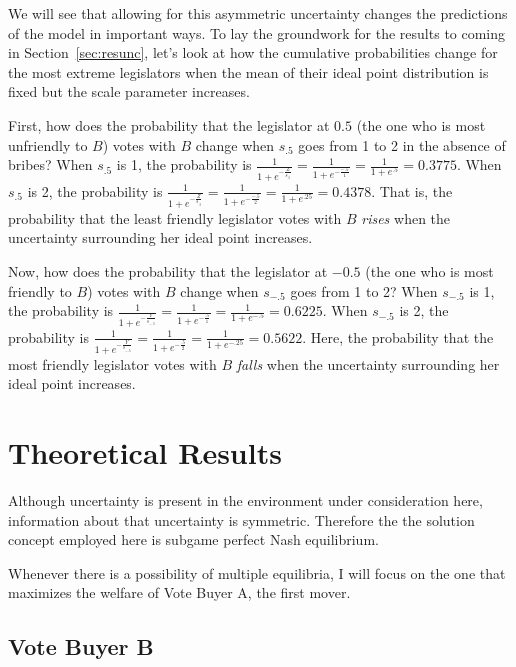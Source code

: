 \documentclass[12pt]{article}
\begin{document}
We will see that allowing for this asymmetric uncertainty changes the predictions of the model in important ways. To lay the groundwork for the results to coming in Section~\ref{sec:resunc}, let's look at how the cumulative probabilities change for the most extreme legislators when the mean of their ideal point distribution is fixed but the scale parameter increases.

First, how does the probability that the legislator at $0.5$ (the one who is most unfriendly to $B$) votes with $B$ change when $s_{.5}$ goes from 1 to 2 in the absence of bribes? When $s_{.5}$ is 1, the probability is $\frac{1}{1+e^{-\frac{Z}{s_{.5}}}} = \frac{1}{1+e^{-\frac{-.5}{1}}} = \frac{1}{1+e^{.5}} = 0.3775$. When $s_{.5}$ is 2, the probability is $\frac{1}{1+e^{-\frac{Z}{s_{.5}}}} = \frac{1}{1+e^{-\frac{-.5}{2}}} = \frac{1}{1+e^{.25}} = 0.4378$. That is, the probability that the least friendly legislator votes with $B$ \textit{rises} when the uncertainty surrounding her ideal point increases.

Now, how does the probability that the legislator at $-0.5$ (the one who is most friendly to $B$) votes with $B$ change when $s_{-.5}$ goes from 1 to 2? When $s_{-.5}$ is 1, the probability is $\frac{1}{1+e^{-\frac{Y}{s_{-.5}}}} = \frac{1}{1+e^{-\frac{.5}{1}}} = \frac{1}{1+e^{-.5}} = 0.6225$. When $s_{-.5}$ is 2, the probability is $\frac{1}{1+e^{-\frac{Y}{s_{-.5}}}} = \frac{1}{1+e^{-\frac{.5}{2}}} = \frac{1}{1+e^{-.25}} = 0.5622$. Here, the probability that the most friendly legislator votes with $B$ \textit{falls} when the uncertainty surrounding her ideal point increases.



\section{Theoretical Results}
\label{sec:res}

Although uncertainty is present in the environment under consideration here, information about that uncertainty is symmetric. Therefore the the solution concept employed here is subgame perfect Nash equilibrium.

Whenever there is a possibility of multiple equilibria, I will focus on the one that maximizes the welfare of Vote Buyer A, the first mover.


\subsection{Vote Buyer B}
\label{sec:resB}
\end{document}
